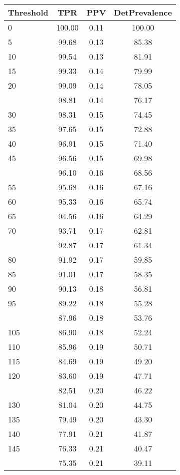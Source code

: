 \begin{table}[ht]
\centering
\begin{tabular}{lccc}
  \toprule
Threshold & TPR & PPV & DetPrevalence \\ 
  \midrule
0 & 100.00 & 0.11 & 100.00 \\ 
  5 & 99.68 & 0.13 & 85.38 \\ 
  10 & 99.54 & 0.13 & 81.91 \\ 
  15 & 99.33 & 0.14 & 79.99 \\ 
  20 & 99.09 & 0.14 & 78.05 \\ 
   \addlinespace
25 & 98.81 & 0.14 & 76.17 \\ 
  30 & 98.31 & 0.15 & 74.45 \\ 
  35 & 97.65 & 0.15 & 72.88 \\ 
  40 & 96.91 & 0.15 & 71.40 \\ 
  45 & 96.56 & 0.15 & 69.98 \\ 
   \addlinespace
50 & 96.10 & 0.16 & 68.56 \\ 
  55 & 95.68 & 0.16 & 67.16 \\ 
  60 & 95.33 & 0.16 & 65.74 \\ 
  65 & 94.56 & 0.16 & 64.29 \\ 
  70 & 93.71 & 0.17 & 62.81 \\ 
   \addlinespace
75 & 92.87 & 0.17 & 61.34 \\ 
  80 & 91.92 & 0.17 & 59.85 \\ 
  85 & 91.01 & 0.17 & 58.35 \\ 
  90 & 90.13 & 0.18 & 56.81 \\ 
  95 & 89.22 & 0.18 & 55.28 \\ 
   \addlinespace
100 & 87.96 & 0.18 & 53.76 \\ 
  105 & 86.90 & 0.18 & 52.24 \\ 
  110 & 85.96 & 0.19 & 50.71 \\ 
  115 & 84.69 & 0.19 & 49.20 \\ 
  120 & 83.60 & 0.19 & 47.71 \\ 
   \addlinespace
125 & 82.51 & 0.20 & 46.22 \\ 
  130 & 81.04 & 0.20 & 44.75 \\ 
  135 & 79.49 & 0.20 & 43.30 \\ 
  140 & 77.91 & 0.21 & 41.87 \\ 
  145 & 76.33 & 0.21 & 40.47 \\ 
   \addlinespace
150 & 75.35 & 0.21 & 39.11 \\ 

\end{tabular}
\end{table}
